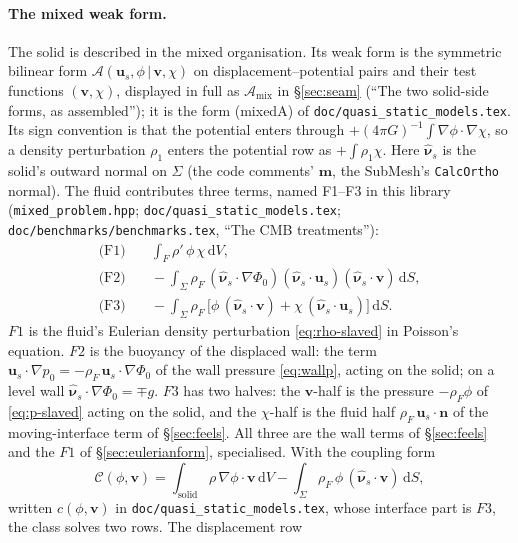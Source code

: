 \documentclass[11pt]{article}
\theoremstyle{definition}
\theoremstyle{remark}
\newcommand{\bu}{\mathbf{u}}
\newcommand{\bv}{\mathbf{v}}
\newcommand{\bn}{\mathbf{n}}
\newcommand{\dS}{\,\mathrm{d}S}
\newcommand{\dV}{\,\mathrm{d}V}
\newcommand{\code}[1]{\texttt{#1}}
\newcommand{\nuhs}{\hat{\boldsymbol{\nu}}_s}
\begin{document}
\paragraph{The mixed weak form.} The solid is described in the mixed
organisation. Its weak form is the symmetric bilinear form $\mathcal
A(\bu_s, \phi\,|\,\bv, \chi)$ on displacement--potential pairs and
their test functions $(\bv, \chi)$, displayed in full as $\mathcal
A_{\mathrm{mix}}$ in \S\ref{sec:seam} (``The two solid-side forms, as
assembled''); it is the form (mixedA) of
\code{doc/quasi\_static\_models.tex}. Its sign convention is that the
potential enters through $+(4\pi G)^{-1}\int\nabla\phi\cdot\nabla\chi$,
so a density perturbation $\rho_1$ enters the potential row as
$+\int\rho_1\chi$. Here $\nuhs$ is the solid's outward normal on
$\Sigma$ (the code comments' $\mathbf m$, the SubMesh's
\code{CalcOrtho} normal). The fluid contributes three terms, named
F1--F3 in this library (\code{mixed\_problem.hpp};
\code{doc/quasi\_static\_models.tex}; \code{doc/benchmarks/benchmarks.tex}, ``The
CMB treatments''):
\begin{align}
  \text{(F1)}&\quad \int_F\rho'\,\phi\,\chi\dV ,
  \nonumber\\
  \text{(F2)}&\quad -\int_\Sigma\rho_F\,(\nuhs\cdot\nabla\Phi_0)
    (\nuhs\cdot\bu_s)(\nuhs\cdot\bv)\dS ,
  \label{eq:F123}\\
  \text{(F3)}&\quad -\int_\Sigma\rho_F\,\bigl[\phi\,(\nuhs\cdot\bv)
    + \chi\,(\nuhs\cdot\bu_s)\bigr]\dS .
  \nonumber
\end{align}
$F1$ is the fluid's Eulerian density perturbation
\eqref{eq:rho-slaved} in Poisson's equation. $F2$ is the buoyancy of the
displaced wall: the term $\bu_s\cdot\nabla p_0 =
-\rho_F\,\bu_s\cdot\nabla\Phi_0$ of the wall pressure \eqref{eq:wallp},
acting on the solid; on a level wall $\nuhs\cdot\nabla\Phi_0 = \mp g$.
$F3$ has two halves: the $\bv$-half is the pressure $-\rho_F\phi$ of
\eqref{eq:p-slaved} acting on the solid, and the $\chi$-half is the
fluid half $\rho_F\,\bu_s\cdot\bn$ of the moving-interface term of
\S\ref{sec:feels}. All three are the wall terms of \S\ref{sec:feels}
and the $F1$ of \S\ref{sec:eulerianform}, specialised. With the coupling
form
\begin{equation*}
  \mathcal C(\phi, \bv) = \int_{\text{solid}}\rho\,\nabla\phi\cdot\bv\dV
  - \int_\Sigma\rho_F\,\phi\,(\nuhs\cdot\bv)\dS ,
\end{equation*}
written $c(\phi, \bv)$ in \code{doc/quasi\_static\_models.tex}, whose
interface part is $F3$, the class solves two rows. The displacement row
\end{document}
